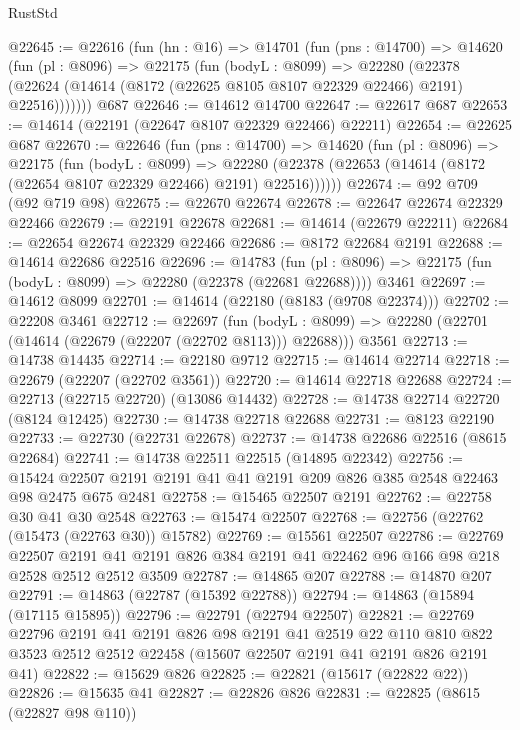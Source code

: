 \begin{lexlean}{RustStd}
\begin{coremodule}
@22645 := @22616
    (fun (hn : @16) =>
    @14701
      (fun (pns : @14700) =>
      @14620
        (fun (pl : @8096) =>
        @22175
          (fun (bodyL : @8099) =>
          @22280
            (@22378 (@22624 (@14614 (@8172 (@22625 @8105 @8107 @22329 @22466) @2191) @22516)))))))
    @687
@22646 := @14612 @14700
@22647 := @22617 @687
@22653 := @14614 (@22191 (@22647 @8107 @22329 @22466) @22211)
@22654 := @22625 @687
@22670 := @22646
    (fun (pns : @14700) =>
    @14620
      (fun (pl : @8096) =>
      @22175
        (fun (bodyL : @8099) =>
        @22280 (@22378 (@22653 (@14614 (@8172 (@22654 @8107 @22329 @22466) @2191) @22516))))))
@22674 := @92 @709 (@92 @719 @98)
@22675 := @22670 @22674
@22678 := @22647 @22674 @22329 @22466
@22679 := @22191 @22678
@22681 := @14614 (@22679 @22211)
@22684 := @22654 @22674 @22329 @22466
@22686 := @8172 @22684 @2191
@22688 := @14614 @22686 @22516
@22696 := @14783
    (fun (pl : @8096) => @22175 (fun (bodyL : @8099) => @22280 (@22378 (@22681 @22688))))
    @3461
@22697 := @14612 @8099
@22701 := @14614 (@22180 (@8183 (@9708 @22374)))
@22702 := @22208 @3461
@22712 := @22697
    (fun (bodyL : @8099) => @22280 (@22701 (@14614 (@22679 (@22207 (@22702 @8113))) @22688)))
    @3561
@22713 := @14738 @14435
@22714 := @22180 @9712
@22715 := @14614 @22714
@22718 := @22679 (@22207 (@22702 @3561))
@22720 := @14614 @22718 @22688
@22724 := @22713 (@22715 @22720) (@13086 @14432)
@22728 := @14738 @22714 @22720 (@8124 @12425)
@22730 := @14738 @22718 @22688
@22731 := @8123 @22190
@22733 := @22730 (@22731 @22678)
@22737 := @14738 @22686 @22516 (@8615 @22684)
@22741 := @14738 @22511 @22515 (@14895 @22342)
@22756 := @15424 @22507 @2191 @2191 @41 @41 @2191 @209 @826 @385 @2548 @22463 @98 @2475 @675 @2481
@22758 := @15465 @22507 @2191
@22762 := @22758 @30 @41 @30 @2548
@22763 := @15474 @22507
@22768 := @22756 (@22762 (@15473 (@22763 @30)) @15782)
@22769 := @15561 @22507
@22786 := @22769
    @22507
    @2191
    @41
    @2191
    @826
    @384
    @2191
    @41
    @22462
    @96
    @166
    @98
    @218
    @2528
    @2512
    @2512
    @3509
@22787 := @14865 @207
@22788 := @14870 @207
@22791 := @14863 (@22787 (@15392 @22788))
@22794 := @14863 (@15894 (@17115 @15895))
@22796 := @22791 (@22794 @22507)
@22821 := @22769
    @22796
    @2191
    @41
    @2191
    @826
    @98
    @2191
    @41
    @2519
    @22
    @110
    @810
    @822
    @3523
    @2512
    @2512
    @22458
    (@15607 @22507 @2191 @41 @2191 @826 @2191 @41)
@22822 := @15629 @826
@22825 := @22821 (@15617 (@22822 @22))
@22826 := @15635 @41
@22827 := @22826 @826
@22831 := @22825 (@8615 (@22827 @98 @110))

\end{coremodule}
\end{lexlean}

